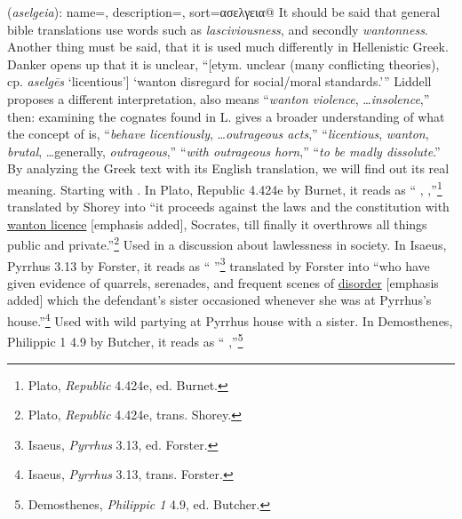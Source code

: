 \item[Brutal (violence),]

(\textit{aselgeia}):
{
    name=,
    description={},
    sort=ασελγεια@
}
It should be said that general bible translations use words such as \emph{lasciviousness}, and secondly \emph{wantonness}. Another thing must be said, that it is used much differently in Hellenistic Greek. 
Danker opens up that it is unclear, ``[etym. unclear (many conflicting theories), cp. \emph{aselgēs} `licentious'] `wanton disregard for social/moral standards.''' 
Liddell proposes a different interpretation,  also means ``\emph{wanton violence}, \ldots \emph{insolence},'' 
then: examining the cognates found in L. gives a broader understanding of what the concept of  is,
 ``\emph{behave licentiously}, \ldots \emph{outrageous acts},'' 
 ``\emph{licentious}, \emph{wanton}, \emph{brutal}, \ldots generally, \emph{outrageous},''
 ``\emph{with outrageous horn},''
 ``\emph{to be madly dissolute}.''
By analyzing the Greek text with its English translation, we will find out its real meaning. 
Starting with . 
In Plato, Republic 4.424e by Burnet, it reads as `` \underline{}, ,''\footnote{Plato, \emph{Republic} 4.424e, ed. Burnet.}
translated by Shorey into ``it proceeds against the laws and the constitution with \underline{wanton licence} [emphasis added], Socrates, till finally it overthrows all things public and private.''\footnote{Plato, \emph{Republic} 4.424e, trans. Shorey.} Used in a discussion about lawlessness in society. 
In Isaeus, Pyrrhus 3.13 by Forster, it reads as `` \underline{} ''\footnote{Isaeus, \emph{Pyrrhus} 3.13, ed. Forster.}
translated by Forster into ``who have given evidence of quarrels, serenades, and frequent scenes of \underline{disorder} [emphasis added] which the defendant's sister occasioned whenever she was at Pyrrhus's house.''\footnote{Isaeus, \emph{Pyrrhus} 3.13, trans. Forster.} Used with wild partying at Pyrrhus house with a sister. 
In Demosthenes, Philippic 1 4.9 by Butcher, it reads as `` \underline{} ,''\footnote{Demosthenes, \emph{Philippic 1} 4.9, ed. Butcher.}
